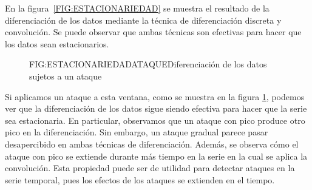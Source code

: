 En la figura~\ref{FIG:ESTACIONARIEDAD} se muestra el resultado de la diferenciación de los datos mediante la técnica de diferenciación discreta y convolución. Se puede observar que ambas técnicas son efectivas para hacer que los datos sean estacionarios.

\begin{figure}[Diferenciación de los datos sujeto a un ataque]{FIG:ESTACIONARIEDADATAQUE}{Diferenciación de los datos sujetos a un ataque}
    \label{FIG:ESTACIONARIEDADATAQUE}
\end{figure}

Si aplicamos un ataque a esta ventana, como se muestra en la figura \ref{FIG:ESTACIONARIEDADATAQUE}, podemos ver que la diferenciación de los datos sigue siendo efectiva para hacer que la serie sea estacionaria. En particular, observamos que un ataque con pico produce otro pico en la diferenciación. Sin embargo, un ataque gradual parece pasar desapercibido en ambas técnicas de diferenciación. Además, se observa cómo el ataque con pico se extiende durante más tiempo en la serie en la cual se aplica la convolución. Esta propiedad puede ser de utilidad para detectar ataques en la serie temporal, pues los efectos de los ataques se extienden en el tiempo.
